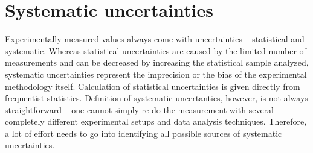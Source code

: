 \section{Systematic uncertainties}

Experimentally measured values always come with uncertainties -- statistical and systematic. Whereas statistical uncertainties are caused by the limited number of measurements and can be decreased by increasing the statistical sample analyzed, systematic uncertainties represent the imprecision or the bias of the experimental methodology itself. Calculation of statistical uncertainties is given directly from frequentist statistics. Definition of systematic uncertanties, however, is not always straightforward -- one cannot simply re-do the measurement with several completely different experimental setups and data analysis techniques. Therefore, a lot of effort needs to go into identifying all possible sources of systematic uncertainties.

